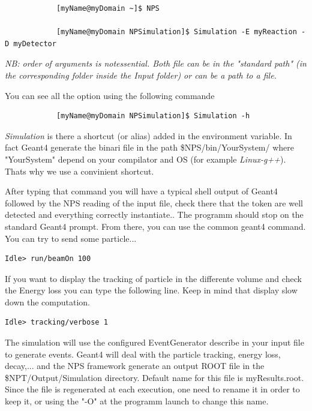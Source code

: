 \documentclass{book}
\begin{document}
	\begin{verbatim}
			[myName@myDomain ~]$ NPS
			
			[myName@myDomain NPSimulation]$ Simulation -E myReaction -D myDetector
	\end{verbatim}
	
\emph{NB: order of arguments is notessential. Both file can be in the "standard path" (in the corresponding folder inside the Input folder) or can be a path to a file.}

You can see all the option using the following commande 

   \begin{verbatim}
			[myName@myDomain NPSimulation]$ Simulation -h
	\end{verbatim}

\emph{Simulation} is there a shortcut (or alias) added in the environment variable. 
In fact Geant4 generate the binari file in the path \$NPS/bin/YourSystem/ where "YourSystem" depend on your compilator and OS (for example \emph{Linux-g++}). Thats why we use a convinient shortcut.

After typing that command you will have a typical shell output of Geant4 followed by the NPS reading of the input file, check there that the token are well detected and everything correctly instantiate.. The programm should stop on the standard Geant4 prompt. From there, you can use the common geant4 command. You can try to send some particle...

\begin{verbatim}
Idle> run/beamOn 100
\end{verbatim}

If you want to display the tracking of particle in the differente volume and check the Energy loss you can type the following line. 
Keep in mind that display slow down the computation.

\begin{verbatim}
Idle> tracking/verbose 1
\end{verbatim}

The simulation will use the configured EventGenerator describe in your input file to generate events. 
Geant4 will deal with the particle tracking, energy loss, decay,... 
and the NPS framework generate an output ROOT file in the \$NPT/Output/Simulation directory. Default name for this file is myResults.root. 
Since the file is regenerated at each execution, one need to rename it in order to keep it, or using the "-O" at the programm launch to change this name. 
\end{document}
